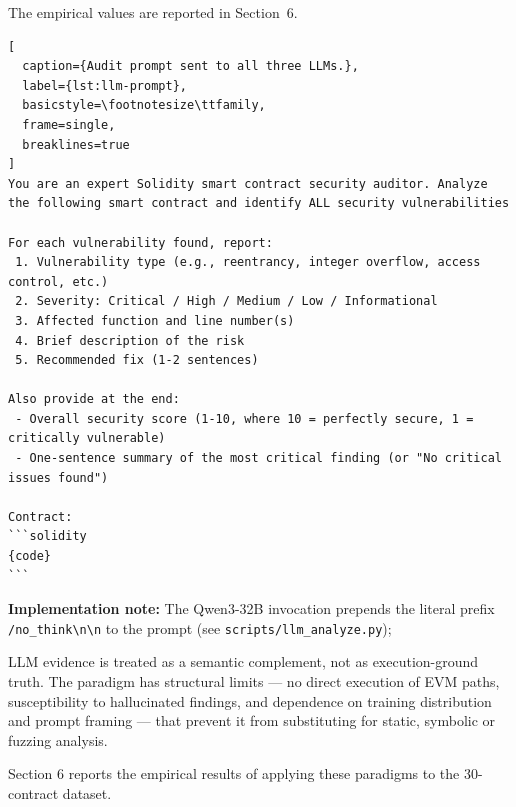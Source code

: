 The empirical values are reported in Section~6.

\begin{lstlisting}[
  caption={Audit prompt sent to all three LLMs.},
  label={lst:llm-prompt},
  basicstyle=\footnotesize\ttfamily,
  frame=single,
  breaklines=true
]
You are an expert Solidity smart contract security auditor. Analyze the following smart contract and identify ALL security vulnerabilities

For each vulnerability found, report:
 1. Vulnerability type (e.g., reentrancy, integer overflow, access control, etc.)
 2. Severity: Critical / High / Medium / Low / Informational
 3. Affected function and line number(s)
 4. Brief description of the risk
 5. Recommended fix (1-2 sentences)

Also provide at the end:
 - Overall security score (1-10, where 10 = perfectly secure, 1 = critically vulnerable)
 - One-sentence summary of the most critical finding (or "No critical issues found")

Contract:
```solidity
{code}
```
\end{lstlisting}

\par\smallskip
\noindent\textbf{Implementation note:} The Qwen3-32B invocation prepends the literal prefix \texttt{/no\_think\textbackslash n\textbackslash n} to the prompt (see \texttt{scripts/llm\_analyze.py});

LLM evidence is treated as a semantic complement, not as execution-ground truth. The paradigm has structural limits — no direct execution of EVM paths, susceptibility to hallucinated findings, and dependence on training distribution and prompt framing — that prevent it from substituting for static, symbolic or fuzzing analysis.

Section 6 reports the empirical results of applying these paradigms to the 30-contract dataset.